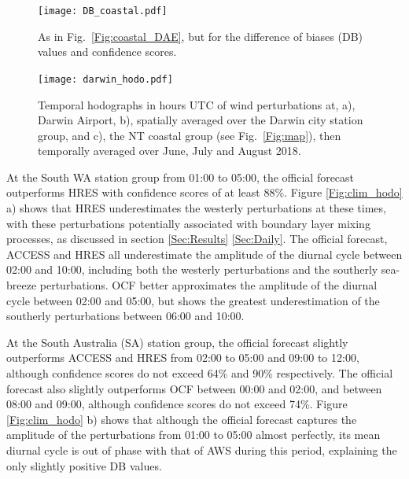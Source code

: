 \documentclass{ametsoc}
\begin{document}
\begin{figure}
\centering
\texttt{[image: DB\_coastal.pdf]}
\caption{As in Fig.~\ref{Fig:coastal_DAE}, but for the difference of biases (DB) values and confidence scores.}
\label{Fig:DB_coastal}
\end{figure}

\begin{figure}
\centering
\texttt{[image: darwin\_hodo.pdf]}
\caption{Temporal hodographs in hours UTC of wind perturbations at, a), Darwin Airport, b), spatially averaged over the Darwin city station group, and c), the NT coastal group (see Fig.~\ref{Fig:map}), then temporally averaged over June, July and August 2018.}
\label{Fig:darwin_hodo}
\end{figure}

At the South WA station group from 01:00 to 05:00, the official forecast outperforms HRES with confidence scores of at least $88\%$. Figure \ref{Fig:clim_hodo} a) shows that HRES underestimates the westerly perturbations at these times, with these perturbations potentially associated with boundary layer mixing processes, as discussed in section \ref{Sec:Results} \ref{Sec:Daily}. The official forecast, ACCESS and HRES all underestimate the amplitude of the diurnal cycle between 02:00 and 10:00, including both the westerly perturbations and the southerly sea-breeze perturbations. OCF better approximates the amplitude of the diurnal cycle between 02:00 and 05:00, but shows the greatest underestimation of the southerly perturbations between 06:00 and 10:00.

At the South Australia (SA) station group, the official forecast slightly outperforms ACCESS and HRES from 02:00 to 05:00 and 09:00 to 12:00, although confidence scores do not exceed 64\% and 90\% respectively. The official forecast also slightly outperforms OCF between 00:00 and 02:00, and between 08:00 and 09:00, although confidence scores do not exceed 74\%. Figure \ref{Fig:clim_hodo} b) shows that although the official forecast captures the amplitude of the perturbations from 01:00 to 05:00 almost perfectly, its mean diurnal cycle is out of phase with that of AWS during this period, explaining the only slightly positive DB values.
\end{document}
